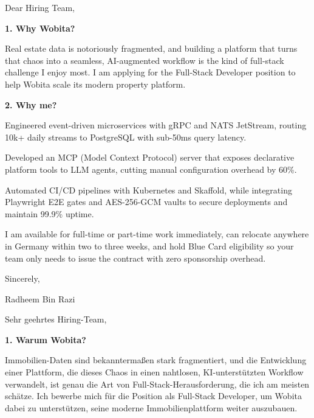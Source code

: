 \documentclass[11pt,a4paper]{coverletter}
\begin{document}

\opening{Dear Hiring Team,}

\vspace{8pt}\noindent\textbf{1. Why Wobita?}\par\vspace{3pt}

Real estate data is notoriously fragmented, and building a platform that turns that chaos into a seamless, AI-augmented workflow is the kind of full-stack challenge I enjoy most. I am applying for the Full-Stack Developer position to help Wobita scale its modern property platform.

\vspace{8pt}\noindent\textbf{2. Why me?}\par\vspace{3pt}

\bullets

  \item Engineered event-driven microservices with gRPC and NATS JetStream, routing 10k+ daily streams to PostgreSQL with sub-50ms query latency.

  \item Developed an MCP (Model Context Protocol) server that exposes declarative platform tools to LLM agents, cutting manual configuration overhead by 60\%.

  \item Automated CI/CD pipelines with Kubernetes and Skaffold, while integrating Playwright E2E gates and AES-256-GCM vaults to secure deployments and maintain 99.9\% uptime.

\bulletsend

I am available for full-time or part-time work immediately, can relocate anywhere in Germany within two to three weeks, and hold Blue Card eligibility so your team only needs to issue the contract with zero sponsorship overhead.

\closing{Sincerely,}{Radheem Bin Razi}

\clearpage
{}


\opening{Sehr geehrtes Hiring-Team,}

\vspace{8pt}\noindent\textbf{1. Warum Wobita?}\par\vspace{3pt}

Immobilien-Daten sind bekanntermaßen stark fragmentiert, und die Entwicklung einer Plattform, die dieses Chaos in einen nahtlosen, KI-unterstützten Workflow verwandelt, ist genau die Art von Full-Stack-Herausforderung, die ich am meisten schätze. Ich bewerbe mich für die Position als Full-Stack Developer, um Wobita dabei zu unterstützen, seine moderne Immobilienplattform weiter auszubauen.
\end{document}
